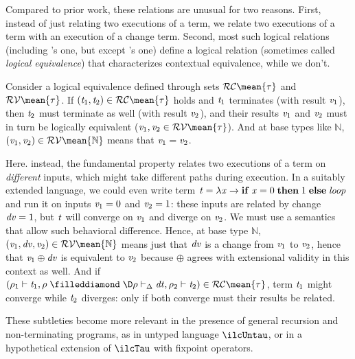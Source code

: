 \begin{remark}
  Compared to prior work,
  these relations are unusual for two reasons. First, instead of
  just relating two executions of a term, we relate two
  executions of a term with an execution of a change term.
  Second, most such logical relations (including
  \citet{Ahmed2006stepindexed}'s one, but except \citet{Acar08}'s
  one) define a logical relation (sometimes called \emph{logical
    equivalence}) that characterizes contextual equivalence, while we
  don't.

  Consider a logical equivalence defined through sets \ensuremath{\mathcal{RC}\mean{\tau}} and \ensuremath{\mathcal{RV}\mean{\tau}}.
  If \ensuremath{(\Varid{t}_{1},\Varid{t}_{2})\in \mathcal{RC}\mean{\tau}} holds and \ensuremath{\Varid{t}_{1}} terminates
  (with result \ensuremath{\Varid{v}_{1}}),
  then \ensuremath{\Varid{t}_{2}} must terminate as well (with result \ensuremath{\Varid{v}_{2}}), and their
  results \ensuremath{\Varid{v}_{1}} and \ensuremath{\Varid{v}_{2}} must in turn be logically equivalent
  (\ensuremath{\Varid{v}_{1},\Varid{v}_{2}\in \mathcal{RV}\mean{\tau}}).
  And at base types like \ensuremath{\mathbb{N}}, \ensuremath{(\Varid{v}_{1},\Varid{v}_{2})\in \mathcal{RV}\mean{\mathbb{N}}}
  means that \ensuremath{\Varid{v}_{1}\mathrel{=}\Varid{v}_{2}}.

  Here. instead, the fundamental property relates two executions
  of a term on \emph{different} inputs, which might take
  different paths during execution. In a suitably extended language,
  we could even write term \ensuremath{\Varid{t}\mathrel{=}\lambda \Varid{x}\to \mathbf{if}\;\Varid{x}\mathrel{=}\mathrm{0}\;\mathbf{then}\;\mathrm{1}\;\mathbf{else}\;\Varid{loop}}
  and run it on inputs \ensuremath{\Varid{v}_{1}\mathrel{=}\mathrm{0}} and \ensuremath{\Varid{v}_{2}\mathrel{=}\mathrm{1}}: these inputs are
  related by change \ensuremath{\Varid{dv}\mathrel{=}\mathrm{1}}, but \ensuremath{\Varid{t}} will converge on \ensuremath{\Varid{v}_{1}} and
  diverge on \ensuremath{\Varid{v}_{2}}. We must use a semantics that allow such
  behavioral difference.
  Hence, at base type \ensuremath{\mathbb{N}}, \ensuremath{(\Varid{v}_{1},\Varid{dv},\Varid{v}_{2})\in \mathcal{RV}\mean{\mathbb{N}}}
  means just that \ensuremath{\Varid{dv}} is a change from \ensuremath{\Varid{v}_{1}} to \ensuremath{\Varid{v}_{2}}, hence that
  \ensuremath{\Varid{v}_{1}\oplus \Varid{dv}} is equivalent to \ensuremath{\Varid{v}_{2}} because \ensuremath{\oplus } agrees
  with extensional validity in this context as well. And if \ensuremath{(\rho_{1}\vdash\Varid{t}_{1},\rho\mathrel{\filleddiamond}\D\rho\vdash_{\Delta}\Varid{dt},\rho_{2}\vdash\Varid{t}_{2})\in \mathcal{RC}\mean{\tau}}, term \ensuremath{\Varid{t}_{1}} might
  converge while \ensuremath{\Varid{t}_{2}} diverges: only if both converge must their
  results be related.

  These subtleties become more relevant in the presence of
  general recursion and non-terminating programs, as in
  untyped language \ensuremath{\ilcUntau}, or in a hypothetical extension of
  \ensuremath{\ilcTau} with fixpoint operators.
\end{remark}


